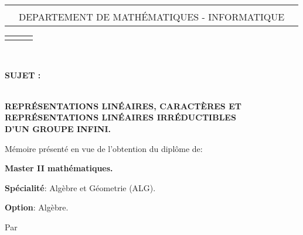 \documentclass[a4paper, 14pt]{report}
\begin{document}
\begin{center}
\begin{tabularx}{\textwidth}{>{\centering}XcX<{\centering}}

         & & \\
          & DEPARTEMENT DE MATHÉMATIQUES - INFORMATIQUE & \\
 
\end{tabularx}
\end{center}
\begin{tabularx}{\textwidth}{>{\centering}XcX<{\centering}}
        & & \\
           
\end{tabularx}\\
\begin{center}

\textbf{ SUJET :}
\begin{tcolorbox}[
	colframe=blue!70,      %
	colback=blue!10,       %
	coltitle=black,        %
	boxrule=1mm,         %
	arc=5mm,               %
	width=\textwidth ,      %
	center                 %
	]
	\centering
	
	{\textbf{\large \\
			 REPRÉSENTATIONS LINÉAIRES, CARACTÈRES ET \\
			REPRÉSENTATIONS LINÉAIRES IRRÉDUCTIBLES \\
			D'UN GROUPE INFINI.\\ }}
\end{tcolorbox}

\vspace{1cm}


{\fontsize{14}{12}\selectfont

Mémoire présenté en vue de l’obtention du diplôme de:
\begin{center}
	\textbf{Master II mathématiques.}
\end{center}

\textbf{Spécialité}: Algèbre et Géometrie (ALG).

\begin{center}
\textbf{Option}: Algèbre.
\end{center}

\begin{center}
Par
\end{center}

}
\end{center}
\end{document}
